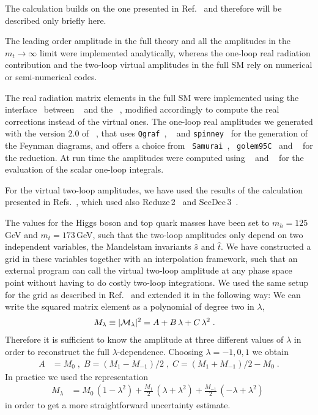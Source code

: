 The calculation builds on the one presented in Ref.~\cite{Heinrich:2017kxx} and therefore will be described only briefly here. 

The leading order amplitude in the full theory and  all the
amplitudes in the $m_t\to\infty$ limit were implemented analytically, whereas the
one-loop real radiation contribution and the two-loop virtual
amplitudes in the full SM rely on numerical or semi-numerical
codes.

The real radiation matrix elements in the full SM were implemented
using the interface~\cite{Luisoni:2013cuh}
between \gosam~\cite{Cullen:2011ac,Cullen:2014yla} and
the \powhegbox~\cite{Nason:2004rx,Frixione:2007vw,Alioli:2010xd}, modified
accordingly to compute the real corrections instead of the virtual
ones. The one-loop real amplitudes we generated with the version
2.0 of \gosam{}~\cite{Cullen:2014yla}, that
uses {\tt Qgraf}~\cite{Nogueira:1991ex}, \form~\cite{Kuipers:2012rf} and
{\tt spinney}~\cite{Cullen:2010jv} for the generation of the Feynman
diagrams, and offers a choice from {\tt
Samurai}~\cite{Mastrolia:2010nb,vanDeurzen:2013pja}, {\tt
golem95C}~\cite{Binoth:2008uq,Cullen:2011kv,Guillet:2013msa}
and \ninja{}~\cite{Peraro:2014cba} for the
reduction.  At run time the amplitudes were computed using
\ninja{}~\cite{Peraro:2014cba} and \avholo{}~\cite{vanHameren:2010cp}
for the evaluation of the scalar one-loop integrals.

For the virtual two-loop amplitudes, we have used the results of the
calculation presented in Refs.~\cite{Borowka:2016ehy,Borowka:2016ypz},
which used also {\sc Reduze}\,2~\cite{vonManteuffel:2012np} and {\sc
 SecDec}\,3~\cite{Borowka:2015mxa}.

The values for the Higgs boson and top quark masses have been set to
$m_h=125$\,GeV and $m_t=173$\,GeV, such that the two-loop amplitudes
only depend on two independent variables, the Mandelstam invariants
$\hat{s}$ and $\hat{t}$.  We have constructed a grid in these
variables together with an interpolation framework, such that an
external program can call the virtual two-loop amplitude at any phase space
point without having to do costly two-loop integrations.
We used the same setup for the grid as described in Ref.~\cite{Heinrich:2017kxx} and extended it in the following way:
We can write the squared matrix element as a polynomial of degree two in $\lambda$, 
\begin{align}
M_\lambda& \equiv |{\cal M}_\lambda|^2=A+B\,\lambda + C\,\lambda^2\;.
\end{align}
Therefore it is sufficient to know the amplitude at three different values of $\lambda$ in order to reconstruct the full $\lambda$-dependence. 
Choosing $\lambda=-1,0,1$ we obtain
\begin{align}
A&=M_0\;,\; B=(M_1-M_{-1})/2\;,\; C=(M_1+M_{-1})/2-M_0\;.
\end{align}
In practice we used the representation 
\begin{align}
M_\lambda &=M_0\,(1-\lambda^2)+\frac{M_1}{2}\,(\lambda+\lambda^2) + \frac{M_{-1}}{2}\,(-\lambda+\lambda^2)\;
\end{align}
in order to get a more straightforward uncertainty estimate.

